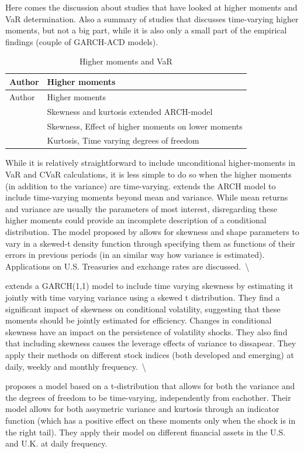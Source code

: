 \documentclass[a4paper, twoside]{templates/ociamthesis}
\begin{document}
Here comes the discussion about studies that have looked at higher moments and VaR determination. Also a summary of studies that discusses time-varying higher moments, but not a big part, while it is also only a small part of the empirical findings (couple of GARCH-ACD models).

\begin{longtable}[]{@{}ll@{}}
\caption{Higher moments and VaR}\tabularnewline
\toprule
Author & Higher moments\tabularnewline
\midrule
\endfirsthead
\toprule
Author & Higher moments\tabularnewline
\midrule
\endhead
\textcite{hansen1994} & Skewness and kurtosis extended ARCH-model\tabularnewline
\textcite{harvey1999} & Skewness, Effect of higher moments on lower moments\tabularnewline
\textcite{brooks2005} & Kurtosis, Time varying degrees of freedom\tabularnewline
\bottomrule
\end{longtable}

\noindent While it is relatively straightforward to include unconditional higher-moments in VaR and CVaR calculations, it is less simple to do so when the higher moments (in addition to the variance) are time-varying. \textcite{hansen1994} extends the ARCH model to include time-varying moments beyond mean and variance. While mean returns and variance are usually the parameters of most interest, disregarding these higher moments could provide an incomplete description of a conditional distribution. The model proposed by \textcite{hansen1994} allows for skewness and shape parameters to vary in a skewed-t density function through specifying them as functions of their errors in previous periods (in an similar way how variance is estimated). Applications on U.S. Treasuries and exchange rates are discussed.~\textbackslash{}

\noindent \textcite{harvey1999} extends a GARCH(1,1) model to include time varying skewness by estimating it jointly with time varying variance using a skewed t distribution. They find a significant impact of skewness on conditional volatility, suggesting that these moments should be jointly estimated for efficiency. Changes in conditional skewness have an impact on the persistence of volatility shocks. They also find that including skewness causes the leverage effects of variance to dissapear. They apply their methods on different stock indices (both developed and emerging) at daily, weekly and monthly frequency.~\textbackslash{}

\noindent \textcite{brooks2005} proposes a model based on a t-distribution that allows for both the variance and the degrees of freedom to be time-varying, independently from eachother. Their model allows for both assymetric variance and kurtosis through an indicator function (which has a positive effect on these moments only when the shock is in the right tail). They apply their model on different financial assets in the U.S. and U.K. at daily frequency.
\end{document}
